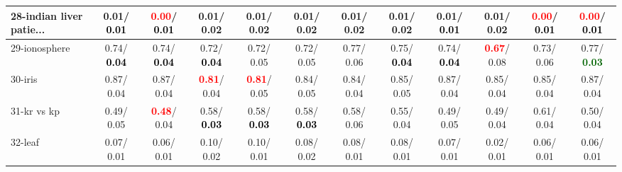 \begin{table}[h]
\begin{center}
{\begin{tabular}{lc|c|c|c|c|c|c|c|c|c|c}
28-indian liver patie... &   0.01/\textcolor{black}{\textbf{  0.01}} & \textcolor{red}{\textbf{  0.00}}/\textcolor{black}{\textbf{  0.01}} &   0.01/  0.02 &   0.01/  0.02 &   0.01/  0.02 &   0.01/  0.02 &   0.01/  0.02 &   0.01/\textcolor{black}{\textbf{  0.01}} &   0.01/  0.02 & \textcolor{red}{\textbf{  0.00}}/\textcolor{black}{\textbf{  0.01}} & \textcolor{red}{\textbf{  0.00}}/\textcolor{black}{\textbf{  0.01}} \\ \hline
29-ionosphere &   0.74/\textcolor{black}{\textbf{  0.04}} &   0.74/\textcolor{black}{\textbf{  0.04}} &   0.72/\textcolor{black}{\textbf{  0.04}} &   0.72/  0.05 &   0.72/  0.05 &   0.77/  0.06 &   0.75/\textcolor{black}{\textbf{  0.04}} &   0.74/\textcolor{black}{\textbf{  0.04}} & \textcolor{red}{\textbf{  0.67}}/  0.08 &   0.73/  0.06 &   0.77/\textcolor{darkgreen}{\textbf{  0.03}} \\
30-iris &   0.87/  0.04 &   0.87/  0.04 & \textcolor{red}{\textbf{  0.81}}/  0.04 & \textcolor{red}{\textbf{  0.81}}/  0.05 &   0.84/  0.05 &   0.84/  0.04 &   0.85/  0.05 &   0.87/  0.04 &   0.85/  0.04 &   0.85/  0.04 &   0.87/  0.04 \\
31-kr vs kp &   0.49/  0.05 & \textcolor{red}{\textbf{  0.48}}/  0.04 &   0.58/\textcolor{black}{\textbf{  0.03}} &   0.58/\textcolor{black}{\textbf{  0.03}} &   0.58/\textcolor{black}{\textbf{  0.03}} &   0.58/  0.06 &   0.55/  0.04 &   0.49/  0.05 &   0.49/  0.04 &   0.61/  0.04 &   0.50/  0.04 \\
32-leaf &   0.07/  0.01 &   0.06/  0.01 &   0.10/  0.02 &   0.10/  0.01 &   0.08/  0.02 &   0.08/  0.01 &   0.08/  0.01 &   0.07/  0.01 &   0.02/  0.01 &   0.06/  0.01 &   0.06/  0.01 \\\end{tabular}}\label{stratsALCKappa0aSVM}
\end{center}
\end{table}
